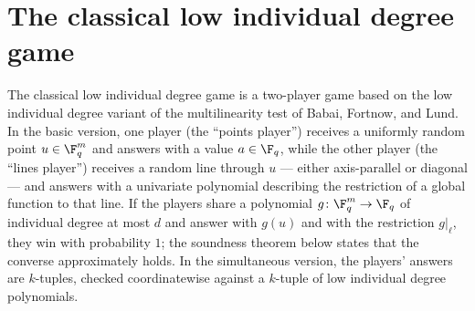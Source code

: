\section{The classical low individual degree game}
\label{sec:ld-verifier}
\label{sec:ld-game}

The classical low individual degree game is a two-player game based on the low individual degree variant of the multilinearity test of Babai, Fortnow, and Lund. In the basic version, one player (the ``points player'') receives a uniformly random point $u \in \F_q^m$ and answers with a value $a \in \F_q$, while the other player (the ``lines player'') receives a random line through $u$ --- either axis-parallel or diagonal --- and answers with a univariate polynomial describing the restriction of a global function to that line. If the players share a polynomial $g\colon \F_q^m \to \F_q$ of individual degree at most $d$ and answer with $g(u)$ and with the restriction $g|_\ell$, they win with probability $1$; the soundness theorem below states that the converse approximately holds. In the simultaneous version, the players' answers are $k$-tuples, checked coordinatewise against a $k$-tuple of low individual degree polynomials.

